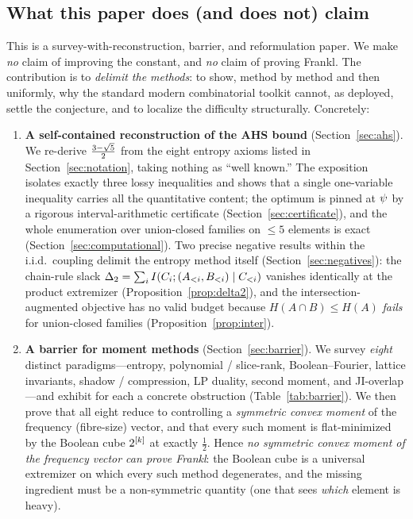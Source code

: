 \documentclass[11pt]{amsart}
\theoremstyle{definition}
\theoremstyle{remark}
\begin{document}
\subsection{What this paper does (and does not) claim}
This is a survey-with-reconstruction, barrier, and reformulation paper. We make
\emph{no} claim of improving the constant, and \emph{no} claim of proving Frankl.
The contribution is to \emph{delimit the methods}: to show, method by method and
then uniformly, why the standard modern combinatorial toolkit cannot, as
deployed, settle the conjecture, and to localize the difficulty structurally.
Concretely:

\begin{enumerate}[label=(\roman*),leftmargin=2.2em]
\item \textbf{A self-contained reconstruction of the AHS bound}
(Section~\ref{sec:ahs}). We re-derive $\tfrac{3-\sqrt{5}}{2}$ from the eight entropy axioms
listed in Section~\ref{sec:notation}, taking nothing as ``well known.'' The
exposition isolates exactly three lossy inequalities and shows that a single
one-variable inequality carries all the quantitative content; the optimum is
pinned at $\psi$ by a rigorous interval-arithmetic certificate
(Section~\ref{sec:certificate}), and the whole enumeration over union-closed
families on $\le 5$ elements is exact (Section~\ref{sec:computational}). Two
precise negative results within the i.i.d.\ coupling delimit the entropy method
itself (Section~\ref{sec:negatives}): the chain-rule slack
$\Delta_2=\sum_i I(C_i;(A_{<i},B_{<i})\mid C_{<i})$ vanishes identically at the
product extremizer (Proposition~\ref{prop:delta2}), and the intersection-augmented
objective has no valid budget because $H(A\cap B)\le H(A)$ \emph{fails} for
union-closed families (Proposition~\ref{prop:inter}).

\item \textbf{A barrier for moment methods} (Section~\ref{sec:barrier}). We survey
\emph{eight} distinct paradigms---entropy, polynomial / slice-rank,
Boolean--Fourier, lattice invariants, shadow / compression, LP duality, second
moment, and JI-overlap---and exhibit for each a concrete obstruction
(Table~\ref{tab:barrier}). We then prove that all eight reduce to controlling a
\emph{symmetric convex moment} of the frequency (fibre-size) vector, and that
every such moment is flat-minimized by the Boolean cube $2^{[k]}$ at exactly
$\tfrac12$. Hence \emph{no symmetric convex moment of the frequency vector can
prove Frankl}: the Boolean cube is a universal extremizer on which every such
method degenerates, and the missing ingredient must be a non-symmetric quantity
(one that sees \emph{which} element is heavy).


\end{enumerate}
\end{document}
